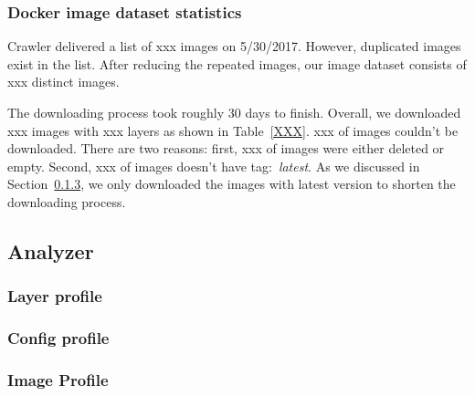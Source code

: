 
\subsubsection{Docker image dataset statistics}

Crawler delivered a list of xxx images on 5/30/2017. However, duplicated images exist in the list. After reducing the repeated images, our image dataset consists of xxx distinct images. 

The downloading process took roughly 30 days to finish. Overall, we downloaded xxx images with xxx layers as shown in Table~\ref{XXX}. xxx of images couldn't be downloaded. There are two reasons: first, xxx of images were either deleted or empty. Second, xxx of images doesn't have tag:~\textit{latest}. As we discussed in Section~\ref{}, we only downloaded the images with latest version to shorten the downloading process.



%
%

\subsection{Analyzer}

\subsubsection{Layer profile}

\subsubsection{Config profile}

\subsubsection{Image Profile}